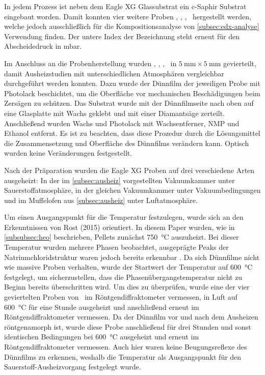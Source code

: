 In jedem Prozess ist neben dem Eagle XG Glassubstrat ein c-Saphir Substrat eingebaut worden.
Damit konnten vier weitere Proben \csamplethree, \csampleone, \csampletwo, \csamplefour\ hergestellt werden, welche
jedoch ausschließlich für die Kompositionsanalyse von \cref{subsec:edx-analyse} Verwendung finden.
Der untere Index der Bezeichnung steht erneut für den Abscheidedruck in \unit{\milli \bar}.

Im Anschluss an die Probenherstellung wurden \samplethree, \sampleone, \sampletwo, \samplefour\ in
$\qty{5}{\milli\meter}\times \qty{5}{\milli\meter}$ gevierteilt, damit Ausheizstudien mit unterschiedlichen Atmosphären
vergleichbar durchgeführt werden konnten.
Dazu wurde der Dünnfilm der jeweiligen Probe mit Photolack beschichtet, um die Oberfläche vor
mechanischen Beschädigungen beim Zersägen zu schützen.
Das Substrat wurde mit der Dünnfilmseite nach oben auf eine Glasplatte mit Wachs geklebt und mit einer
Diamantsäge zerteilt.
Anschließend wurden Wachs und Photolack mit Wachsentferner, NMP und Ethanol entfernt.
Es ist zu beachten, dass diese Prozedur durch die Lösungsmittel die Zusammensetzung und Oberfläche des Dünnfilms
verändern kann.
Optisch wurden keine Veränderungen festgestellt.

Nach der Präparation wurden die Eagle XG Proben auf drei verschiedene Arten ausgeheizt:
In der im \cref{subsec:ausheiz} vorgestellten Vakuumkammer unter Sauerstoffatmosphäre, in der gleichen Vakuumkammer
unter Vakuumbedingungen und im Muffelofen aus \cref{subsec:ausheiz} unter Luftatmosphäre.

Um einen Ausgangspunkt für die Temperatur festzulegen, wurde sich an den Erkenntnissen von Rost (2015) orientiert.
In diesem Paper wurden, wie in \cref{subsubsec:heo} beschrieben, Pellets zunächst \qty{750}{\degreeCelsius} auszuheizt.
Bei dieser Temperatur wurden mehrere Phasen beobachtet, ausgeprägte Peaks der Natriumchloridstruktur waren jedoch
bereits erkennbar \autocite{Rost2015}.
Da sich Dünnfilme nicht wie massive Proben verhalten, wurde der Startwert der Temperatur auf \qty{600}{\degreeCelsius}
festgelegt, um sicherzustellen, dass die Phasenübergangstemperatur nicht zu Beginn bereits überschritten wird.
Um dies zu überprüfen, wurde eine der vier geviertelten Proben von \sampletwo\, im Röntgendiffraktometer vermessen,
in Luft auf \qty{600}{\degreeCelsius} für eine Stunde ausgeheizt und anschließend erneut im Röntgendiffraktometer vermessen.
Da der Dünnfilm vor und nach dem Ausheizen röntgenamorph ist, wurde diese Probe anschließend für drei Stunden und sonst
identischen Bedingungen bei \qty{600}{\degreeCelsius} ausgeheizt und erneut im Röntgendiffraktometer vermessen.
Auch hier waren keine Beugungsreflexe des Dünnfilms zu erkennen, weshalb die Temperatur als Ausgangspunkt für den
Sauerstoff-Ausheizvorgang festgelegt wurde.

